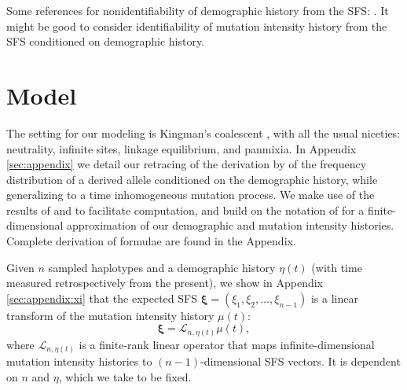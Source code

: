 \documentclass[11pt]{article}
\begin{document}
Some references for nonidentifiability of demographic history from the SFS: \cite{Baharian2018-np, Bhaskar2014-fu, Terhorst2015-xt, Myers2008-jp}.
It might be good to consider identifiability of mutation intensity history from the SFS conditioned on demographic history.




\section*{Model}\label{sec:model}

The setting for our modeling is Kingman's coalescent \cite{Kingman1982-ge, Kingman1982-tf, Kingman1982-ys, Kingman2000-jr}, with all the usual niceties: neutrality, infinite sites, linkage equilibrium, and panmixia.
In Appendix \ref{sec:appendix} we detail our retracing of the derivation by \cite{Griffiths1998-qf} of the frequency distribution of a derived allele conditioned on the demographic history, while generalizing to a time inhomogeneous mutation process.
We make use of the results of \cite{Polanski2003-kg} and \cite{Polanski2003-ll} to facilitate computation, and build on the notation of \cite{Rosen2018-bb} for a finite-dimensional approximation of our demographic and mutation intensity histories.
Complete derivation of formulae are found in the Appendix.

Given $n$ sampled haplotypes and a demographic history $\eta(t)$ (with time measured retrospectively from the present), we show in Appendix \ref{sec:appendix:xi} that the expected SFS $\boldsymbol \xi = (\xi_1, \xi_2,\dots, \xi_{n-1})$ is a linear transform of the mutation intensity history $\mu(t)$:
\begin{equation}
  \label{eqn:transform}
\boldsymbol \xi = \mathcal{L}_{n,\eta(t)}\mu(t),
\end{equation}
where $\mathcal{L}_{n,\eta(t)}$ is a finite-rank linear operator that maps infinite-dimensional mutation intensity histories to $(n-1)$-dimensional SFS vectors.
It is dependent on $n$ and $\eta$, which we take to be fixed.
\end{document}
